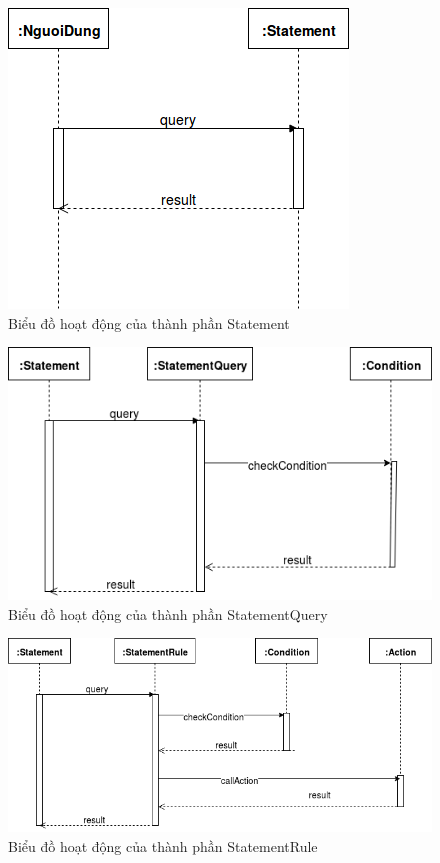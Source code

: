 \begin{figure}[h!]
	\center
	\includegraphics[scale=0.4]{image/language_diagram-statement}	
	\caption{Biểu đồ hoạt động của thành phần Statement}
\end{figure}


\begin{figure}[h!]
	\center
	\includegraphics[scale=0.4]{image/language_diagram-statement_query}	
	\caption{Biểu đồ hoạt động của thành phần StatementQuery}
\end{figure}


\begin{figure}[h!]
	\center
	\includegraphics[scale=0.4]{image/language_diagram-statement_rule}	
	\caption{Biểu đồ hoạt động của thành phần StatementRule}
\end{figure}


